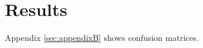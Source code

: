 \section{Results}
\label{sec:results}


Appendix \ref*{sec:appendixB} shows confusion matrices.






